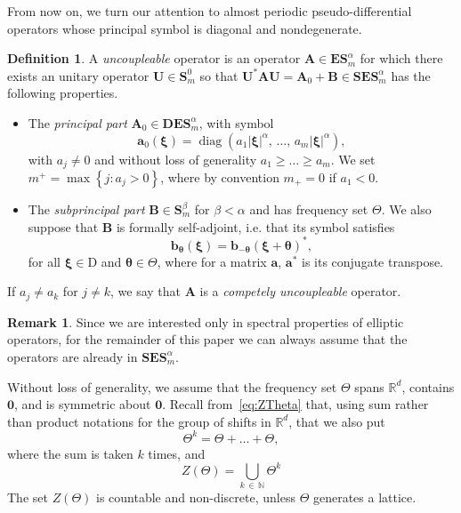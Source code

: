 \documentclass[10pt]{amsart}
\theoremstyle{definition}\newtheorem{defi}[theo]{Definition}\newtheorem{rema}[theo]{Remark}\newtheorem{exam}[theo]{Example}\newtheorem{nota}[theo]{Notation}
\DeclareMathOperator{\diag}{diag}
\newcommand{\RD}{\mathrm{D}}
\newcommand{\R}{\mathbb R}
\newcommand{\N}{\mathbb N}
\newcommand{\btheta}{\boldsymbol \theta}
\newcommand{\bxi}{\boldsymbol \xi}
\newcommand{\ba}{\mathbf a}
\newcommand{\BA}{\mathbf A}
\newcommand{\BB}{\mathbf B}
\newcommand{\BD}{\mathbf D}
\newcommand{\BE}{\mathbf E}
\newcommand{\BS}{\mathbf S}
\newcommand{\BU}{\mathbf U}
\newcommand{\bbb}{\mathbf b}
\newcommand{\pd}{uncoupleable}
\newcommand{\mpu}{competely uncoupleable}
\newcommand{\abs}[1]{\left\lvert #1 \right\rvert}
\newcommand{\set}[1]{\left\{ #1 \right\}}
\begin{document}
From now on, we turn our attention to almost periodic pseudo-differential operators whose principal symbol is diagonal and nondegenerate.
\begin{defi}
A \emph{\pd} operator is an operator $\BA \in \BE\BS_m^\alpha$ for which there exists an unitary operator $\BU \in \BS_m^0$ so that $\BU^* \BA \BU = \BA_0 + \BB \in
\BS\BE\BS_m^\alpha$ has the following properties.
\begin{itemize}
\item The \emph{principal part} $\BA_0 \in \BD \BE \BS_m^\alpha$, with symbol
\begin{equation}\label{eq:defh0}
\ba_0(\bxi) = \diag\left(a_1 \abs \bxi^\alpha,\,\dotsc,\,a_m \abs
\bxi^\alpha\right),
\end{equation}
with $a_j \ne 0$ and without loss of generality $a_1 \ge \dotso \ge a_m$. We set $m^+ = \max\set{j : a_j > 0}$, where by convention $m_+ = 0$ if $a_1 < 0$.
\item The \emph{subprincipal part} $\BB \in \BS_m^\beta$ for $\beta < \alpha$ and has frequency set $\Theta$. We also suppose that $\BB$ is formally self-adjoint, i.e. that its symbol satisfies
\begin{equation}\label{eq:selfadjb}
\bbb_{\btheta}(\bxi) = \bbb_{-\btheta}(\bxi + \btheta)^*,
\end{equation}
for all $\bxi \in \RD$ and $\btheta \in \Theta$, where for a matrix $\ba$, $\ba^*$ is its conjugate transpose.
\end{itemize}
If $a_j \ne a_k$ for $j \ne k$, we say that $\BA$ is a \emph{\mpu} operator.
\end{defi}

\begin{rema}
Since we are interested only in spectral properties of elliptic operators, for the remainder of this paper we can always assume that the operators are already in $\BS\BE\BS_m^\alpha$.
\end{rema}

Without loss of generality, we assume that the frequency set $\Theta$ spans $\R^d$, contains $\mathbf 0$, and is symmetric about $\mathbf 0$. Recall from~\eqref{eq:ZTheta} that, using sum rather than product notations for the group of shifts in $\R^d$, that we also put
\begin{equation}\label{eq:thetasum}
\Theta^k = \Theta + \dotso + \Theta,
\end{equation}
where the sum is taken $k$ times, and
\begin{equation}\label{eq:ZTh}
Z(\Theta) = \bigcup_{k\,\in\,\N}
\Theta^k
\end{equation}
The set $Z(\Theta)$ is countable and non-discrete, unless $\Theta$ generates a lattice.
\end{document}
